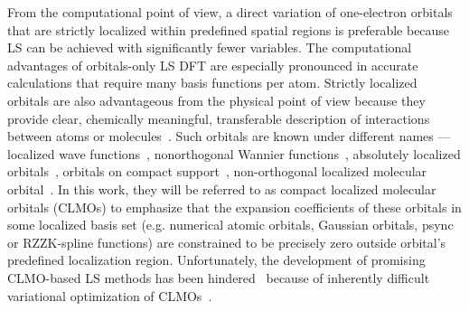 \documentclass[aps,prl,twocolumn,reprint,amsmath,amssymb]{revtex4-1}
\begin{document}
From the computational point of view, a direct variation of one-electron orbitals that are strictly localized within predefined spatial regions is preferable because LS can be achieved with significantly fewer variables. %
The computational advantages of orbitals-only LS DFT are especially pronounced in accurate calculations that require many basis functions per atom. 
Strictly localized orbitals are also advantageous from the physical point of view because they provide clear, chemically meaningful, transferable description of interactions between atoms or molecules~\cite{RZZK-weitao, stoll, khaliullin2007unravelling, khaliullin2008analysis}. 
%
Such orbitals are known under different names --- localized wave functions~\cite{ordejon1995linear}, nonorthogonal Wannier functions~\cite{weitao,RZZK}, absolutely localized orbitals~\cite{stoll1980use}, orbitals on compact support~\cite{RZZK}, non-orthogonal localized molecular orbital~\cite{weitao}. In this work, they will be referred to as compact localized molecular orbitals (CLMOs) to emphasize that the expansion coefficients of these orbitals in some localized basis set (e.g. numerical atomic orbitals, Gaussian orbitals, psync or RZZK-spline functions) are constrained to be precisely zero outside orbital's predefined localization region.
Unfortunately, the development of promising CLMO-based LS methods has been hindered~\cite{a:weitao-yang-2013,a:ls-tsuchida-aomm, fattebert-recent} because of inherently difficult variational optimization of CLMOs~\cite{a:ls-mauri-galli-car-1993,ordejon1995linear,a:ls-rev-1999, fattebert2004linear, peng2013effective, a:ls-tsuchida-aomm, weitao-yang}. 
%
\end{document}
